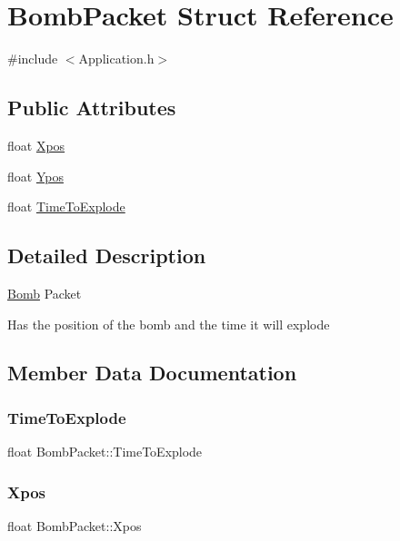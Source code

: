 \hypertarget{struct_bomb_packet}{}\section{Bomb\+Packet Struct Reference}
\label{struct_bomb_packet}


{\ttfamily \#include $<$Application.\+h$>$}

\subsection*{Public Attributes}
\begin{DoxyCompactItemize}
\item 
float \hyperlink{struct_bomb_packet_ae2c558c55820bf97e954370743222224}{Xpos}
\item 
float \hyperlink{struct_bomb_packet_a5279e358c68ee4506035cb2855352955}{Ypos}
\item 
float \hyperlink{struct_bomb_packet_a7d44fc787b6cb299267bb2a1a5a61dd2}{Time\+To\+Explode}
\end{DoxyCompactItemize}


\subsection{Detailed Description}
\hyperlink{class_bomb}{Bomb} Packet

Has the position of the bomb and the time it will explode 

\subsection{Member Data Documentation}
\hypertarget{struct_bomb_packet_a7d44fc787b6cb299267bb2a1a5a61dd2}{}\label{struct_bomb_packet_a7d44fc787b6cb299267bb2a1a5a61dd2} 
\subsubsection{\texorpdfstring{Time\+To\+Explode}{TimeToExplode}}
{\footnotesize\ttfamily float Bomb\+Packet\+::\+Time\+To\+Explode}

\hypertarget{struct_bomb_packet_ae2c558c55820bf97e954370743222224}{}\label{struct_bomb_packet_ae2c558c55820bf97e954370743222224} 
\subsubsection{\texorpdfstring{Xpos}{Xpos}}
{\footnotesize\ttfamily float Bomb\+Packet\+::\+Xpos}

